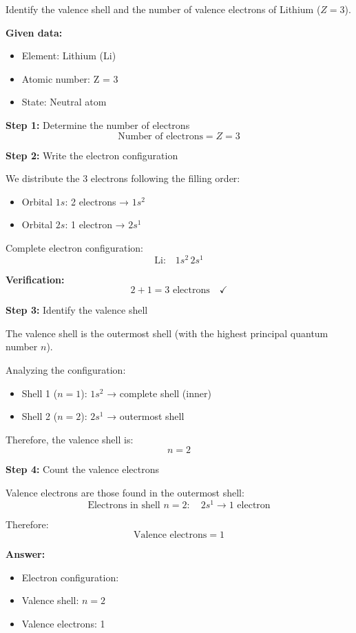 \begin{exercise}
    Identify the valence shell and the number of valence electrons of Lithium (\( Z = 3 \)).
    \begin{solu}
        \textbf{Given data:}
        \begin{itemize}
            \item Element: Lithium (Li)
            \item Atomic number: Z = 3
            \item State: Neutral atom
        \end{itemize}

        \textbf{Step 1:} Determine the number of electrons
        \[
            \text{Number of electrons} = Z = 3
        \]

        \textbf{Step 2:} Write the electron configuration

        We distribute the 3 electrons following the filling order:
        \begin{itemize}
            \item Orbital \(1s\): 2 electrons → \(1s^2\)
            \item Orbital \(2s\): 1 electron → \(2s^1\)
        \end{itemize}

        Complete electron configuration:
        \[
            \text{Li:} \quad 1s^2 \, 2s^1
        \]

        \textbf{Verification:}
        \[
            2 + 1 = 3 \text{ electrons} \quad \checkmark
        \]

        \textbf{Step 3:} Identify the valence shell

        The valence shell is the outermost shell (with the highest principal quantum number \(n\)).

        Analyzing the configuration:
        \begin{itemize}
            \item Shell 1 (\(n = 1\)): \(1s^2\) → complete shell (inner)
            \item Shell 2 (\(n = 2\)): \(2s^1\) → outermost shell
        \end{itemize}

        Therefore, the valence shell is:
        \[
            \boxed{n = 2}
        \]

        \textbf{Step 4:} Count the valence electrons

        Valence electrons are those found in the outermost shell:
        \[
            \text{Electrons in shell } n = 2: \quad 2s^1 \rightarrow 1 \text{ electron}
        \]

        Therefore:
        \[
            \boxed{\text{Valence electrons} = 1}
        \]

        \textbf{Answer:}
        \begin{itemize}
            \item Electron configuration: 
            \item Valence shell: \(n = 2\)
            \item Valence electrons: 1
        \end{itemize}
    \end{solu}
\end{exercise}
